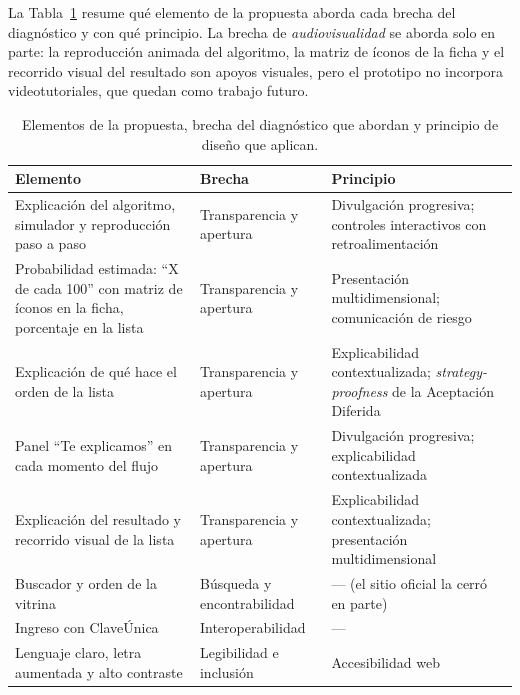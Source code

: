 La Tabla~\ref{tab:prop-sintesis} resume qué elemento de la propuesta aborda cada brecha del diagnóstico y con qué principio. La brecha de \emph{audiovisualidad} se aborda solo en parte: la reproducción animada del algoritmo, la matriz de íconos de la ficha y el recorrido visual del resultado son apoyos visuales, pero el prototipo no incorpora videotutoriales, que quedan como trabajo futuro.

\begin{table}[htbp]
\centering
\caption{Elementos de la propuesta, brecha del diagnóstico que abordan y principio de diseño que aplican.}
\label{tab:prop-sintesis}
\small
\begin{tabular}{p{4.0cm}p{3.3cm}p{4.9cm}}
\toprule
\textbf{Elemento} & \textbf{Brecha} & \textbf{Principio} \\
\midrule
Explicación del algoritmo, simulador y reproducción paso a paso & Transparencia y apertura & Divulgación progresiva; controles interactivos con retroalimentación \\
Probabilidad estimada: ``X de cada 100'' con matriz de íconos en la ficha, porcentaje en la lista & Transparencia y apertura & Presentación multidimensional; comunicación de riesgo \\
Explicación de qué hace el orden de la lista & Transparencia y apertura & Explicabilidad contextualizada; \emph{strategy-proofness} de la Aceptación Diferida \\
Panel ``Te explicamos'' en cada momento del flujo & Transparencia y apertura & Divulgación progresiva; explicabilidad contextualizada \\
Explicación del resultado y recorrido visual de la lista & Transparencia y apertura & Explicabilidad contextualizada; presentación multidimensional \\
Buscador y orden de la vitrina & Búsqueda y encontrabilidad & --- (el sitio oficial la cerró en parte) \\
Ingreso con ClaveÚnica & Interoperabilidad & --- \\
Lenguaje claro, letra aumentada y alto contraste & Legibilidad e inclusión & Accesibilidad web \\
\bottomrule
\end{tabular}
\end{table}
